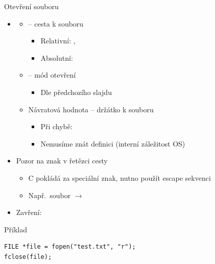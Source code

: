 \begin{frame}[fragile]{Otevření souboru}

  \begin{itemize}
    \item {}
    \begin{itemize}

      \item {} -- cesta k souboru
      \begin{itemize}
	\item Relativní: , 
	\item Absolutní: 
      \end{itemize}

      \pause

      \item {} -- mód otevření
      \begin{itemize}
	\item Dle předchozího slajdu
      \end{itemize}

      \pause

      \item Návratová hodnota -- držátko k souboru
      \begin{itemize}
	\item Při chybě: 
	\item Nemusíme znát definici  (interní záležitost OS)
      \end{itemize}
    \end{itemize}

    \pause

    \item Pozor na znak \code{\\} v řetězci cesty
    \begin{itemize}
      \item C pokládá \code{\\} za speciální znak, nutno použít escape sekvenci
	\code{\\\\}
      \item Např.\ soubor  $\rightarrow$
    \end{itemize}

    \pause

    \item Zavření: 
  \end{itemize}

  \begin{block}{Příklad}
  \begin{lstlisting}
FILE *file = fopen("test.txt", "r");
fclose(file);
  \end{lstlisting}
  \end{block}

\end{frame}

